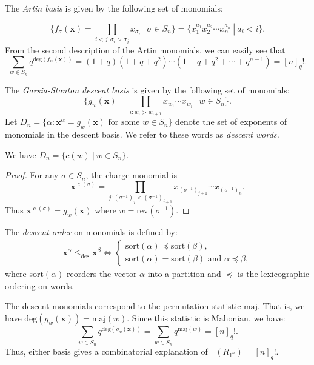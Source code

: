 \documentclass[ALCO, Unicode]{cedram}
\DeclareMathOperator{\Hilb}{Hilb}
\DeclareMathOperator{\cw}{c}
\DeclareMathOperator{\Hilbq}{\Hilb_q}
\begin{document}
The \textit{Artin basis} is given by the following set of monomials:

\[\{f_\sigma(\mathbf{x}) = \prod_{i<j, \sigma_i > \sigma_j} x_{\sigma_i} \  | \ \sigma \in S_n \} = \{x_1^{a_1}x_2^{a_2}\cdots x_n^{a_n} \ | \ a_i < i\}.\]
From the second description of the Artin monomials, we can easily see that \[\sum_{w\in S_n}q^{\text{deg}(f_w(\mathbf{x}))} = (1+q)(1+q+q^2) \cdots (1+q+q^2+\cdots + q^{n-1}) = [n]_q!.\]

The \textit{Garsia-Stanton descent basis} is given by the following set of monomials:
\[\{g_w (\mathbf{x}) = \prod_{i:w_i > w_{i+1}} x_{w_1} \cdots x_{w_i} \ | \ w \in S_n\}.\]
Let $D_n = \{\alpha : \mathbf{x}^{\alpha} = g_w(\mathbf{x}) \text{ for some } w \in S_n\}$ denote the set of exponents of monomials in the descent basis. We refer to these words as \textit{descent words.} 
\begin{lemma}\label{lemma:charge and majt}
    We have $D_n = \{c(w) \ | \ w \in S_n\}.$
\end{lemma}
\begin{proof}
    For any $\sigma\in S_n$, the charge monomial is  \[\mathbf{x}^{\cw(\sigma)} = \prod_{j:(\sigma^{-1})_{j} < (\sigma^{-1})_{j+1}} x_{(\sigma^{-1})_{j+1}} \cdots x_{(\sigma^{-1})_n}.\]
Thus $\mathbf{x}^{\cw(\sigma)} = g_w(\mathbf{x})$ where $w = \text{rev}(\sigma^{-1})$. 
\end{proof}

The \textit{descent order} on monomials is defined by:
\begin{align}\label{eq:descent order}
    \mathbf{x}^{\alpha} \leq_{\text{des}}\mathbf{x}^{\beta} \Leftrightarrow \begin{cases}
    \text{sort}(\alpha) \preceq \text{sort}(\beta),  \\ \text{sort}(\alpha) = \text{sort}(\beta) \text{ and } \alpha \preceq \beta,
\end{cases}
\end{align}
where sort$(\alpha)$ reorders the vector $\alpha$ into a partition and $\preceq$ is the lexicographic ordering on words.

The descent monomials correspond to the permutation statistic $\text{maj}$. That is, we have $\text{deg}(g_w(\mathbf{x})) = \text{maj}(w)$. 
Since this statistic is Mahonian, we have:
 \[\sum\limits_{w\in S_n} q^{\text{deg}(g_{w}(\mathbf{x}))} = \sum\limits_{w\in S_n} q^{\text{maj}(w)} = [n]_q!.\]
Thus, either basis gives a combinatorial explanation of $\Hilbq(R_{1^n}) = [n]_q!$. 
\end{document}
